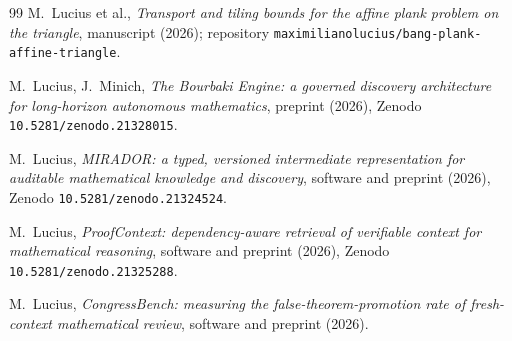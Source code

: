 \documentclass[11pt]{amsart}
\theoremstyle{definition}
\theoremstyle{remark}
\begin{document}
\begin{thebibliography}{99}
 M.~Lucius et al., \emph{Transport and tiling bounds for the
affine plank problem on the triangle}, manuscript (2026); repository
\texttt{maximilianolucius/bang-plank-affine-triangle}.

 M.~Lucius, J.~Minich, \emph{The Bourbaki Engine: a
governed discovery architecture for long-horizon autonomous mathematics},
preprint (2026), Zenodo \texttt{10.5281/zenodo.21328015}.

 M.~Lucius, \emph{MIRADOR: a typed, versioned
intermediate representation for auditable mathematical knowledge and discovery},
software and preprint (2026), Zenodo \texttt{10.5281/zenodo.21324524}.

 M.~Lucius, \emph{ProofContext: dependency-aware
retrieval of verifiable context for mathematical reasoning}, software and
preprint (2026), Zenodo \texttt{10.5281/zenodo.21325288}.

 M.~Lucius, \emph{CongressBench: measuring the
false-theorem-promotion rate of fresh-context mathematical review}, software and
preprint (2026).

\end{thebibliography}
\end{document}
